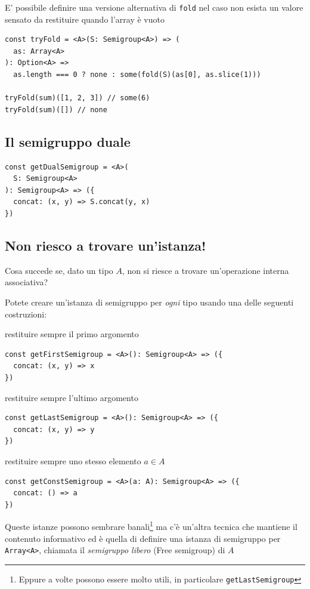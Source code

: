 \documentclass[12pt]{article}
\begin{document}
E' possibile definire una versione alternativa di \texttt{fold} nel caso non esista un valore sensato da restituire quando l'array è vuoto

\begin{verbatim}
const tryFold = <A>(S: Semigroup<A>) => (
  as: Array<A>
): Option<A> =>
  as.length === 0 ? none : some(fold(S)(as[0], as.slice(1)))

tryFold(sum)([1, 2, 3]) // some(6)
tryFold(sum)([]) // none
\end{verbatim}

\subsection{Il semigruppo duale}

\begin{verbatim}
const getDualSemigroup = <A>(
  S: Semigroup<A>
): Semigroup<A> => ({
  concat: (x, y) => S.concat(y, x)
})
\end{verbatim}

\subsection{Non riesco a trovare un'istanza!}

Cosa succede se, dato un tipo $A$, non si riesce a trovare un'operazione interna associativa?

Potete creare un'istanza di semigruppo per \emph{ogni} tipo usando una delle seguenti costruzioni:

restituire sempre il primo argomento

\begin{verbatim}
const getFirstSemigroup = <A>(): Semigroup<A> => ({
  concat: (x, y) => x
})
\end{verbatim}

restituire sempre l'ultimo argomento

\begin{verbatim}
const getLastSemigroup = <A>(): Semigroup<A> => ({
  concat: (x, y) => y
})
\end{verbatim}

restituire sempre uno stesso elemento $a \in A$

\begin{verbatim}
const getConstSemigroup = <A>(a: A): Semigroup<A> => ({
  concat: () => a
})
\end{verbatim}

Queste istanze possono sembrare banali\footnote{Eppure a volte possono essere molto utili, in particolare \texttt{getLastSemigroup}}
ma c'è un'altra tecnica che mantiene il contenuto informativo ed è quella di definire una istanza di semigruppo per \texttt{Array<A>},
chiamata il \emph{semigruppo libero} (Free semigroup) di $A$
\end{document}
